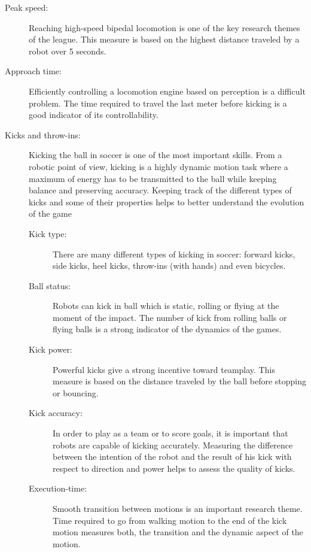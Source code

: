\documentclass{article}
\begin{document}
\begin{description}
\item[Peak speed:] Reaching high-speed bipedal locomotion is one of the key
  research themes of the league.
  This measure is based on the highest distance traveled by a robot over 5 seconds.
  
\item[Approach time:] Efficiently controlling a locomotion engine based on perception
  is a difficult problem.
  The time required to travel the last meter before kicking is a good indicator
  of its controllability.

\item[Kicks and throw-ins:] Kicking the ball in soccer is one of the most important
  skills.
  From a robotic point of view, kicking is a highly dynamic motion task where
  a maximum of energy has to be transmitted to the ball while keeping balance
  and preserving accuracy.
  Keeping track of the different types of kicks and some of their properties helps
  to better understand the evolution of the game
  \begin{description}
  \item[Kick type:] There are many different types of kicking in soccer:
    forward kicks, side kicks, heel kicks, throw-ins (with hands) and even bicycles.
  \item[Ball status:] Robots can kick in ball which is static, rolling or
    flying at the moment of the impact.
    The number of kick from rolling balls or flying balls is a strong indicator
    of the dynamics of the games.
  \item[Kick power:] Powerful kicks give a strong incentive toward teamplay.
    This measure is based on the distance traveled by the ball before stopping or bouncing.
  \item[Kick accuracy:] In order to play as a team or to score goals, it is
    important that robots are capable of kicking accurately.
    Measuring the difference between the intention of the robot and the result of his kick with
    respect to direction and power helps to assess the quality of kicks.
  \item[Execution-time:] Smooth transition between motions is an important research theme.
    Time required to go from walking motion to the end of the kick motion measures both,
    the transition and the dynamic aspect of the motion.
  \end{description}
\end{description}
\end{document}
